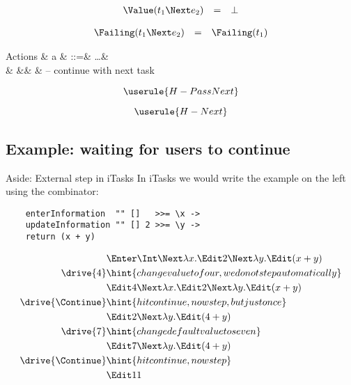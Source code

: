 \begin{equation*}
  \begin{array}{lcl}
    \Value(t_1 \Next e_2) &=& \bot
  \end{array}
\end{equation*}

\begin{equation*}
  \begin{array}{lcl}
    \Failing(t_1 \Next e_2) &=& \Failing(t_1)
  \end{array}
\end{equation*}

\begin{grammar}
  Actions
    & a & ::=& \ldots & \\
    &   &\mid& \Continue  & – continue with next task \\
\end{grammar}

\begin{equation*}
  \userule{H-PassNext}
\end{equation*}

\begin{equation*}
  \userule{H-Next}
\end{equation*}


\subsection{Example: waiting for users to continue}

\begin{margintext}{Aside: External step in iTasks}
  In iTasks we would write the example on the left using the \type{>>=} combinator:
  \begin{verbatim}
    enterInformation  "" []   >>= \x ->
    updateInformation "" [] 2 >>= \y ->
    return (x + y)
  \end{verbatim}
\end{margintext}

\begin{align*}
    & \Enter \Int \Next \lambda x. \Edit 2 \Next \lambda y. \Edit (x + y) \\
  \drive{4} & \hint{change value to four, we do not step automatically} \\
    & \Edit 4 \Next \lambda x. \Edit 2 \Next \lambda y. \Edit (x + y) \\
  \drive{\Continue} & \hint{hit continue, now step, but just once} \\
    & \Edit 2 \Next \lambda y. \Edit (4 + y) \\
  \drive{7} & \hint{change default value to seven} \\
    & \Edit 7 \Next \lambda y. \Edit (4 + y) \\
  \drive{\Continue} & \hint{hit continue, now step} \\
    & \Edit 11 \\
\end{align*}
